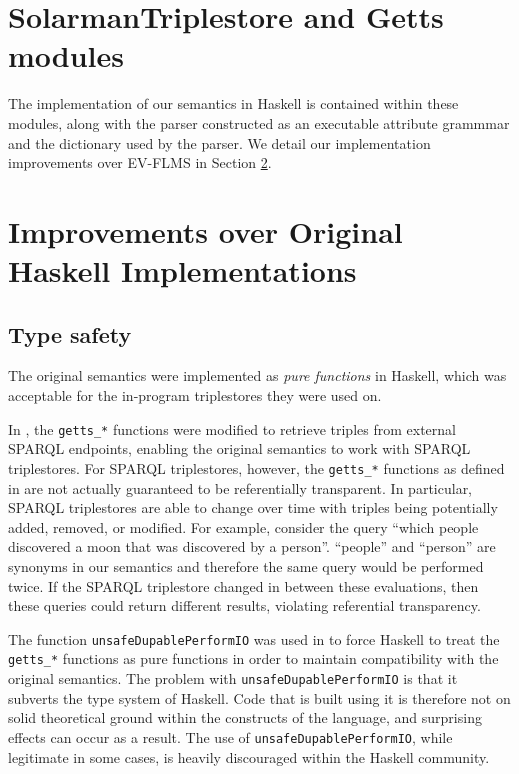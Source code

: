 \documentclass[../main.tex]{subfiles}
\begin{document}
\section{SolarmanTriplestore and Getts modules}

The implementation of our semantics in Haskell is contained within these modules, along with the parser constructed as an executable attribute grammmar and
the dictionary used by the parser.  We detail our implementation improvements over EV-FLMS in Section \ref{section:improvementsimpl}.

\section{Improvements over Original Haskell Implementations}
\label{section:improvementsimpl}

\subsection{Type safety}

The original semantics were implemented as {\em pure functions} in Haskell, which was acceptable for the in-program triplestores they were used on.

In \cite{agboola2015extensible}, the \texttt{getts\_*} functions were modified to retrieve triples from external SPARQL endpoints, enabling the original
semantics to work with SPARQL triplestores.  For SPARQL triplestores, however, the \texttt{getts\_*} functions as defined in \cite{agboola2015extensible} are not actually guaranteed to be referentially transparent. In particular, SPARQL triplestores are able to change over time with triples being potentially added, removed, or modified.
For example, consider the query ``which people discovered a moon that was discovered by a person''.
``people'' and ``person'' are synonyms in our semantics and therefore the same query would be performed twice.  If the SPARQL triplestore changed in between these evaluations,
then these queries could return different results, violating referential transparency.

The function \texttt{unsafeDupablePerformIO} was used in \cite{agboola2015extensible} to force Haskell to treat the \texttt{getts\_*} functions as pure functions
in order to maintain compatibility with the original semantics. The problem with \texttt{unsafeDupablePerformIO} is that it subverts the type system of Haskell.  Code that is built using it is therefore not on
solid theoretical ground within the constructs of the language, and surprising effects can occur as a result.  The use of \texttt{unsafeDupablePerformIO}, while
legitimate in some cases, is heavily discouraged within the Haskell community\cite{tlmvconsensus}.
\end{document}
